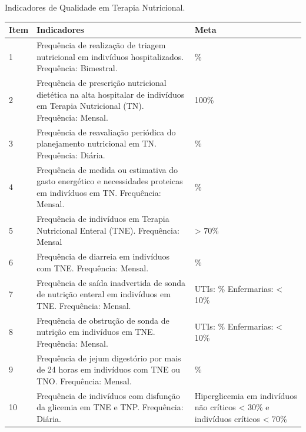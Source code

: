 \begin{quadro}[htb]
\caption{\label{quadro_indicadoresQTN}Indicadores de Qualidade em Terapia Nutricional.}
\label{}
\begin{tabular}{|p{1cm}|p{9cm}|p{5cm}|}
	\hline
	\textbf{Item} & \textbf{Indicadores} & \textbf{Meta} \\ \hline
	1 & Frequência de realização de triagem nutricional em indivíduos hospitalizados. \newline Frequência: Bimestral. & \geq 80\% \\ \hline
	2 & Frequência de prescrição nutricional dietética na alta hospitalar de indivíduos em Terapia Nutricional (TN). \newline Frequência: Mensal. & 100\% \\ \hline
	3 & Frequência de reavaliação periódica do planejamento nutricional em TN. \newline Frequência: Diária. & \geq 85\% \\ \hline
	4 & Frequência de medida ou estimativa do gasto energético e necessidades proteicas em indivíduos em TN. \newline Frequência: Mensal. & \geq 80\% \\ \hline
	5 & Frequência de indivíduos em Terapia Nutricional Enteral (TNE). \newline Frequência: Mensal & > 70\% \\ \hline
	6 & Frequência de diarreia em indivíduos com TNE. \newline Frequência: Mensal. & \leq 10\% \\ \hline
    7 & Frequência de saída inadvertida de sonda de nutrição enteral em indivíduos em
TNE. \newline Frequência: Mensal. & UTIs: \leq 5\% \newline Enfermarias: < 10\%  \\ \hline
    8 & Frequência de obstrução de sonda de nutrição em indivíduos em TNE. \newline Frequência: Mensal. & UTIs: \leq 5\% \newline Enfermarias: < 10\%  \\ \hline
    9 & Frequência de jejum digestório por mais de 24 horas em indivíduos com TNE
ou TNO. \newline Frequência: Mensal. & \leq 10\% \\ \hline
    10 & Frequência de indivíduos com disfunção da glicemia em TNE e TNP. \newline Frequência: Diária. & Hiperglicemia em indivíduos não críticos < 30\% e indivíduos críticos < 70\% \\ \hline

\end{tabular}
\end{quadro}
